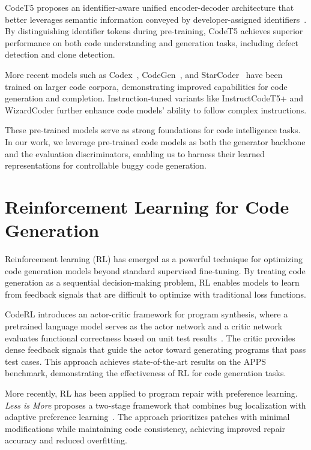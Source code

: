 CodeT5 proposes an identifier-aware unified encoder-decoder architecture that better leverages semantic information conveyed by developer-assigned identifiers~\cite{wang2021codet5identifierawareunifiedpretrained}. By distinguishing identifier tokens during pre-training, CodeT5 achieves superior performance on both code understanding and generation tasks, including defect detection and clone detection.

More recent models such as Codex~\cite{chen2021evaluatinglargelanguagemodels}, CodeGen~\cite{nijkamp2023codegenopenlargelanguage}, and StarCoder~\cite{li2023starcodersourceyou} have been trained on larger code corpora, demonstrating improved capabilities for code generation and completion. Instruction-tuned variants like InstructCodeT5+ and WizardCoder further enhance code models' ability to follow complex instructions.

These pre-trained models serve as strong foundations for code intelligence tasks. In our work, we leverage pre-trained code models as both the generator backbone and the evaluation discriminators, enabling us to harness their learned representations for controllable buggy code generation.

\section{Reinforcement Learning for Code Generation}

Reinforcement learning (RL) has emerged as a powerful technique for optimizing code generation models beyond standard supervised fine-tuning. By treating code generation as a sequential decision-making problem, RL enables models to learn from feedback signals that are difficult to optimize with traditional loss functions.

CodeRL introduces an actor-critic framework for program synthesis, where a pretrained language model serves as the actor network and a critic network evaluates functional correctness based on unit test results~\cite{le2022coderlmasteringcodegeneration}. The critic provides dense feedback signals that guide the actor toward generating programs that pass test cases. This approach achieves state-of-the-art results on the APPS benchmark, demonstrating the effectiveness of RL for code generation tasks.

More recently, RL has been applied to program repair with preference learning. \textit{Less is More} proposes a two-stage framework that combines bug localization with adaptive preference learning~\cite{dai2025moreadaptiveprogramrepair}. The approach prioritizes patches with minimal modifications while maintaining code consistency, achieving improved repair accuracy and reduced overfitting.

